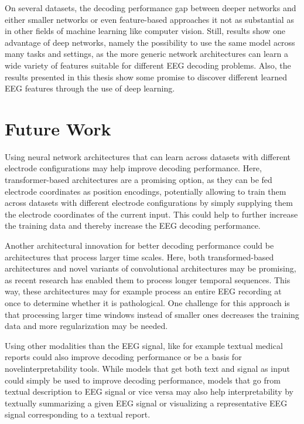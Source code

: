 On several datasets, the decoding performance gap between deeper
networks and either smaller networks or even feature-based approaches it
not as substantial as in other fields of machine learning like computer
vision. Still, results show one advantage of deep networks, namely the
possibility to use the same model across many tasks and settings, as the
more generic network architectures can learn a wide variety of features
suitable for different EEG decoding problems. Also, the results
presented in this thesis show some promise to discover different learned
EEG features through the use of deep learning.


\section{Future Work}\label{future-work}

Using neural network architectures that can learn across datasets with
different electrode configurations may help improve decoding
performance. Here, transformer-based architectures
\citep{DBLP:conf/nips/VaswaniSPUJGKP17} are a promising
option, as they can be fed electrode coordinates as position encodings,
potentially allowing to train them across datasets with different
electrode configurations by simply supplying them the electrode
coordinates of the current input. This could help to further increase
the training data and thereby increase the EEG decoding performance.

Another architectural innovation for better decoding performance could
be architectures that process larger time scales. Here, both
transformed-based architectures
\citep{bigbird,etc,DBLP:journals/corr/abs-2004-05150,longt5,DBLP:journals/tacl/RoySVG21,block_recurrent_transformers,DBLP:conf/nips/DaoFERR22}
and novel variants of convolutional architectures
\citep{DBLP:journals/corr/abs-2302-06646,DBLP:journals/corr/abs-2302-10866}
may be promising, as recent research has enabled them to process longer
temporal sequences. This way, these architectures may for example process
an entire EEG recording at once to determine whether it is
pathological. One challenge for this approach is that processing larger
time windows instead of smaller ones decreases the training data 
and more regularization may be needed.

Using other modalities than the EEG signal, like for example textual medical reports could also improve decoding
performance or be a basis for novelinterpretability tools. While models that get
both text and signal as input could simply be used to improve decoding
performance, models that go from textual description to EEG signal or
vice versa \cite{pmlr-v106-biswal19a,de2022learning} may also
help interpretability by textually summarizing a given EEG signal or
visualizing a representative EEG signal corresponding to a textual
report.

